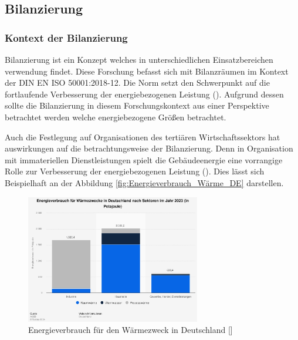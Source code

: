 \subsection{Bilanzierung}

\subsubsection{Kontext der Bilanzierung}

Bilanzierung ist ein Konzept welches in unterschiedlichen Einsatzbereichen verwendung findet. Diese Forschung befasst sich mit Bilanzräumen 
im Kontext der DIN EN ISO 50001:2018-12. Die Norm setzt den Schwerpunkt auf die fortlaufende Verbesserung der energiebezogenen Leistung 
(\cite[Kapitel 0.2]{DIN50001.2018}). Aufgrund dessen sollte die Bilanzierung in diesem Forschungskontext aus einer Perspektive betrachtet werden welche 
energiebezogene Größen betrachtet.

Auch die Festlegung auf Organisationen des tertiären Wirtschaftssektors hat auswirkungen auf die betrachtungsweise der Bilanzierung. 
Denn in Organisation mit immateriellen Dienstleistungen spielt die Gebäudeenergie eine vorrangige Rolle zur Verbesserung der energiebezogenen 
Leistung (\cite[S. 3]{Fichera.2020}). 
Dies lässt sich Beispielhaft an der Abbildung \eqref{fig:Energieverbrauch_Wärme_DE} darstellen.

\begin{figure}[H]
    \centering
    \includegraphics[width=0.68\textwidth]{../../Ressourcen/Abbildungen/Energieverbrauch_für_Wärmezweck_DE.jpg}
    \caption{Energieverbrauch für den Wärmezweck in Deutschland [\cite{AGEB.2024}]}
    \label{fig:Energieverbrauch_Wärme_DE}
\end{figure}

